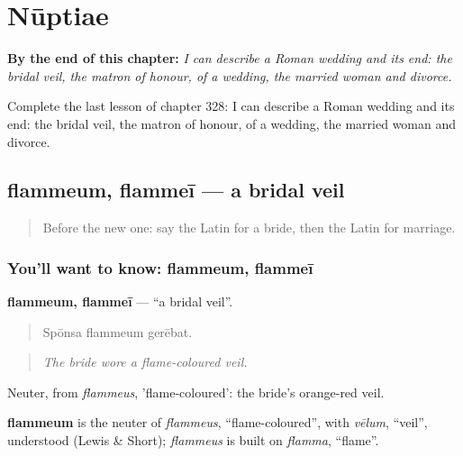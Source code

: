 
\chapter{Nūptiae}
\label{ch:la-nuptiae}

\begin{chapteropening}
\textbf{By the end of this chapter:} \emph{I can describe a Roman wedding and its end: the bridal veil, the matron of honour, of a wedding, the married woman and divorce.}

Complete the last lesson of chapter 328: I can describe a Roman wedding and its end: the bridal veil, the matron of honour, of a wedding, the married woman and divorce.
\end{chapteropening}

\section[flammeum, flammeī]{flammeum, flammeī — a bridal veil}

\label{lesson:LA-C328-flammeum}



\begin{quote}
Before the new one: say the Latin for a bride, then the Latin for marriage.
\end{quote}

\subsection*{You'll want to know: flammeum, flammeī}
\textbf{flammeum, flammeī} — \textquotedblleft{}a bridal veil\textquotedblright{}.

\begin{quote}
Spōnsa flammeum gerēbat.
\end{quote}

\begin{quote}
\emph{The bride wore a flame-coloured veil.}
\end{quote}

Neuter, from \emph{flammeus}, 'flame-coloured': the bride's orange-red veil.

\begin{cousinweb}
\textbf{flammeum} is the neuter of \emph{flammeus}, \textquotedblleft{}flame-coloured\textquotedblright{}, with \emph{vēlum}, \textquotedblleft{}veil\textquotedblright{}, understood (Lewis \& Short); \emph{flammeus} is built on \emph{flamma}, \textquotedblleft{}flame\textquotedblright{}.
\end{cousinweb}

